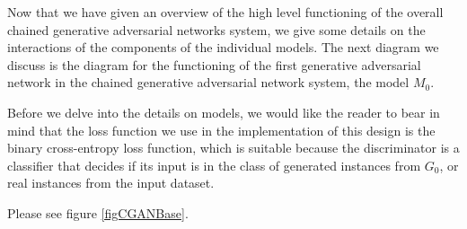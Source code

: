 \documentclass[conference]{IEEEtran}
\begin{document}
Now that we have given an overview of the high level functioning of the overall
chained generative adversarial networks system, we give some details on the
interactions of the components of the individual models.  The next diagram we
discuss is the diagram for the functioning of the first generative adversarial
network in the chained generative adversarial network system, the model $M_{0}$.

Before we delve into the details on models, we would like the reader to bear in
mind that the loss function we use in the implementation of this design is the
binary cross-entropy loss function, which is suitable because the discriminator
is a classifier that decides if its input is in the class of generated instances
from $G_{0}$, or real instances from the input dataset.

Please see figure \ref{figCGANBase}.
\end{document}
